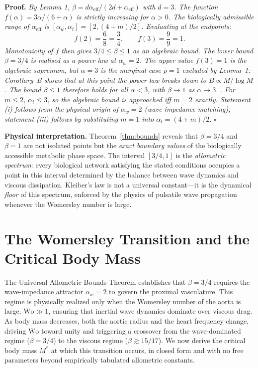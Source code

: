 \documentclass[11pt,a4paper]{article}
\theoremstyle{remark}
\begin{document}
\noindent\textbf{Proof.} \textit{By Lemma 1, $\beta = d\alpha_{\mathrm{eff}}/(2d+\alpha_{\mathrm{eff}})$ with $d=3$. The function $f(\alpha) = 3\alpha/(6+\alpha)$ is strictly increasing for $\alpha > 0$. The biologically admissible range of $\alpha_{\mathrm{eff}}$ is $[\alpha_w, \alpha_t] = [2, (4+m)/2]$. Evaluating at the endpoints:}
\begin{equation*}
f(2) = \frac{6}{8} = \frac{3}{4}, \qquad f(3) = \frac{9}{9} = 1.
\end{equation*}
\textit{Monotonicity of $f$ then gives $3/4 \leq \beta \leq 1$ as an algebraic bound. The lower bound $\beta = 3/4$ is realised as a power law at $\alpha_w = 2$. The upper value $f(3) = 1$ is the algebraic supremum, but $\alpha = 3$ is the marginal case $\rho = 1$ excluded by Lemma~1: Corollary~B shows that at this point the power law breaks down to $B \propto M/\log M$. The bound $\beta \leq 1$ therefore holds for all $\alpha < 3$, with $\beta \to 1$ as $\alpha \to 3^-$. For $m \leq 2$, $\alpha_t \leq 3$, so the algebraic bound is approached iff $m = 2$ exactly. Statement (i) follows from the physical origin of $\alpha_w = 2$ (wave impedance matching); statement (iii) follows by substituting $m=1$ into $\alpha_t = (4+m)/2$. $\square$}

\vspace{0.4em}
\noindent\textbf{Physical interpretation.} Theorem~\ref{thm:bounds} reveals that $\beta = 3/4$ and $\beta = 1$ are not isolated points but the \textit{exact boundary values} of the biologically accessible metabolic phase space. The interval $[3/4, 1]$ is the \textit{allometric spectrum}: every biological network satisfying the stated conditions occupies a point in this interval determined by the balance between wave dynamics and viscous dissipation. Kleiber's law is not a universal constant---it is the dynamical \textit{floor} of this spectrum, enforced by the physics of pulsatile wave propagation whenever the Womersley number is large.

\section{The Womersley Transition and the Critical Body Mass}

The Universal Allometric Bounds Theorem establishes that $\beta = 3/4$
requires the wave-impedance attractor $\alpha_w = 2$ to govern the proximal
vasculature.
This regime is physically realized only when the Womersley number of the aorta
is large, $\mathrm{Wo} \gg 1$, ensuring that inertial wave dynamics dominate
over viscous drag. As body mass decreases, both the aortic radius and the heart
frequency change, driving $\mathrm{Wo}$ toward unity and triggering a crossover
from the wave-dominated regime ($\beta = 3/4$) to the viscous regime ($\beta
\gtrsim 15/17$). We now derive the critical body mass $M^*$ at which this
transition occurs, in closed form and with no free parameters beyond empirically
tabulated allometric constants.
\end{document}
